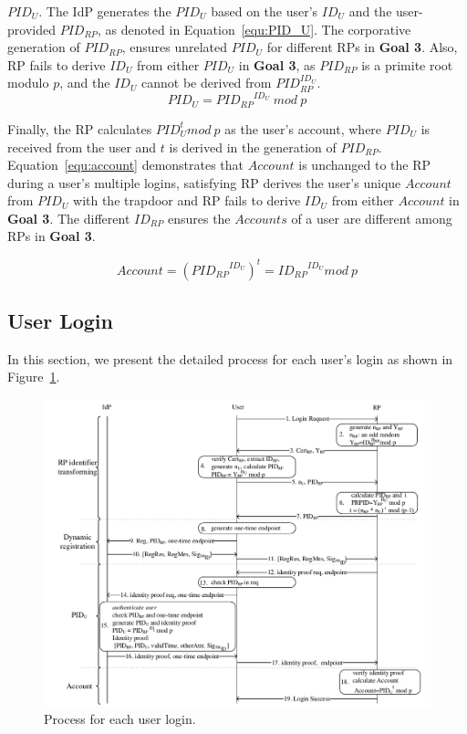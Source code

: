 \noindent\textbf{$PID_U$}. The IdP generates the $PID_U$ based on the user's $ID_U$ and the user-provided $PID_{RP}$, as denoted in Equation~\ref{equ:PID_U}.
The corporative generation of $PID_{RP}$, ensures unrelated $PID_U$  for different RPs in \textbf{Goal 3}. Also, RP fails to derive $ID_U$ from either $PID_U$ in \textbf{Goal 3}, as
   $PID_{RP}$ is a primite root modulo $p$, and the $ID_U$ cannot be derived from $PID_{RP}^{ID_U}$.
\begin{equation}
 PID_U = {PID_{RP}}^{ID_U} \ mod \ p
 \label{equ:PID_U}
\end{equation}

Finally, the RP calculates $PID_U^t mod \ p$ as the  user's account, where $PID_U$ is received from the user and $t$ is derived in the generation of $PID_{RP}$. Equation~\ref{equ:account} demonstrates that $Account$ is unchanged to the RP during a user's multiple logins, satisfying RP derives the user's unique $Account$  from $PID_U$ with the  trapdoor and  RP fails to derive $ID_U$ from either $Account$ in \textbf{Goal 3}. The different $ID_{RP}$ ensures the $Accounts$ of a user are different among RPs in \textbf{Goal 3}.

 \begin{equation}
   Account = ({PID_{RP}}^{ID_U})^t = {ID_{RP}}^{ID_U} mod \ p
   \label{equ:account}
   \end{equation}


\subsection{User Login}
\label{sebsec:loginprocess}
In this section, we present the detailed process for each user's login as shown in Figure~\ref{fig:process}. %

\begin{figure}
  \centering
  \includegraphics[width=0.85\linewidth]{fig/process.pdf}
  \caption{Process for each user login.}
  \label{fig:process}
\end{figure}

